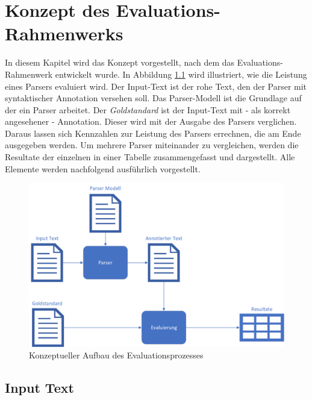 %
\chapter{Konzept des Evaluations-Rahmenwerks}
\label{sec:konzept}

In diesem Kapitel wird das Konzept vorgestellt, nach dem das Evaluations-Rahmenwerk entwickelt wurde. In Abbildung \ref{fig:konzept-aufbau} wird illustriert, wie die Leistung eines Parsers evaluiert wird. Der Input-Text ist der rohe Text, den der Parser mit syntaktischer Annotation versehen soll. Das Parser-Modell ist die Grundlage auf der ein Parser arbeitet. Der \textit{Goldstandard} ist der Input-Text mit - als korrekt angesehener - Annotation. Dieser wird mit der Ausgabe des Parsers verglichen. Daraus lassen sich Kennzahlen zur Leistung des Parsers errechnen, die am Ende ausgegeben werden.
Um mehrere Parser miteinander zu vergleichen, werden die Resultate der einzelnen in einer Tabelle zusammengefasst und dargestellt. Alle Elemente werden nachfolgend ausführlich vorgestellt. 
\begin{figure} [h]

\includegraphics[width=\textwidth]{gfx/konzept-aufbau-png.png} 
\caption{Konzeptueller Aufbau des Evaluationsprozesses}	
\label{fig:konzept-aufbau}	
\end{figure}
		
\section{Input Text}

